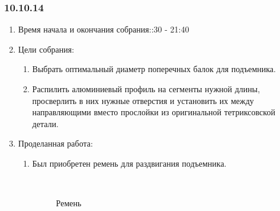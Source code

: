 
\subsubsection{10.10.14}

\begin{enumerate}
	\item Время начала и окончания собрания::30 - 21:40
	\item Цели собрания:\newline
	\begin{enumerate}
	  \item Выбрать оптимальный диаметр поперечных балок для подъемника.\newline
	  
	  \item Распилить алюминиевый профиль на сегменты нужной длины, просверлить в них нужные отверстия и установить их между направляющими вместо прослойки из оригинальной тетриксовской детали.\newline
	  
    \end{enumerate}
	\item Проделанная работа:\newline
	\begin{enumerate}
	  \item Был приобретен ремень для раздвигания подъемника.\newline
	  
	  \begin{figure}[H]
	  	\begin{minipage}[h]{0.2\linewidth}
	  		\center  
	  	\end{minipage}
	  	\begin{minipage}[h]{0.6\linewidth}
	  		\caption{Ремень}
	  	\end{minipage}
	  \end{figure}
      

\end{enumerate}
\end{enumerate}
